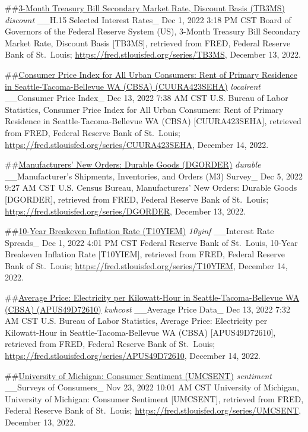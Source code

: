 \documentclass[
]{article}
\begin{document}
\#\#\href{https://fred.stlouisfed.org/series/TB3MS}{3-Month Treasury
Bill Secondary Market Rate, Discount Basis (TB3MS)} \emph{discount}
\_\_H.15 Selected Interest Rates\_ Dec 1, 2022 3:18 PM CST Board of
Governors of the Federal Reserve System (US), 3-Month Treasury Bill
Secondary Market Rate, Discount Basis {[}TB3MS{]}, retrieved from FRED,
Federal Reserve Bank of St.~Louis;
\url{https://fred.stlouisfed.org/series/TB3MS}, December 13, 2022.

\#\#\href{https://fred.stlouisfed.org/series/CUURA423SEHA}{Consumer
Price Index for All Urban Consumers: Rent of Primary Residence in
Seattle-Tacoma-Bellevue WA (CBSA) (CUURA423SEHA)} \emph{localrent}
\_\_Consumer Price Index\_ Dec 13, 2022 7:38 AM CST U.S. Bureau of Labor
Statistics, Consumer Price Index for All Urban Consumers: Rent of
Primary Residence in Seattle-Tacoma-Bellevue WA (CBSA)
{[}CUURA423SEHA{]}, retrieved from FRED, Federal Reserve Bank of
St.~Louis; \url{https://fred.stlouisfed.org/series/CUURA423SEHA},
December 14, 2022.

\#\#\href{https://fred.stlouisfed.org/series/DGORDER}{Manufacturers' New
Orders: Durable Goods (DGORDER)} \emph{durable} \_\_Manufacturer's
Shipments, Inventories, and Orders (M3) Survey\_ Dec 5, 2022 9:27 AM CST
U.S. Census Bureau, Manufacturers' New Orders: Durable Goods
{[}DGORDER{]}, retrieved from FRED, Federal Reserve Bank of St.~Louis;
\url{https://fred.stlouisfed.org/series/DGORDER}, December 13, 2022.

\#\#\href{https://fred.stlouisfed.org/series/T10YIEM}{10-Year Breakeven
Inflation Rate (T10YIEM)} \emph{10yinf} \_\_Interest Rate Spreads\_ Dec
1, 2022 4:01 PM CST Federal Reserve Bank of St.~Louis, 10-Year Breakeven
Inflation Rate {[}T10YIEM{]}, retrieved from FRED, Federal Reserve Bank
of St.~Louis; \url{https://fred.stlouisfed.org/series/T10YIEM}, December
14, 2022.

\#\#\href{https://fred.stlouisfed.org/series/APUS49D72610}{Average
Price: Electricity per Kilowatt-Hour in Seattle-Tacoma-Bellevue WA
(CBSA) (APUS49D72610)} \emph{kwhcost} \_\_Average Price Data\_ Dec 13,
2022 7:32 AM CST U.S. Bureau of Labor Statistics, Average Price:
Electricity per Kilowatt-Hour in Seattle-Tacoma-Bellevue WA (CBSA)
{[}APUS49D72610{]}, retrieved from FRED, Federal Reserve Bank of
St.~Louis; \url{https://fred.stlouisfed.org/series/APUS49D72610},
December 14, 2022.

\#\#\href{https://fred.stlouisfed.org/series/UMCSENT}{University of
Michigan: Consumer Sentiment (UMCSENT)} \emph{sentiment} \_\_Surveys of
Consumers\_ Nov 23, 2022 10:01 AM CST University of Michigan, University
of Michigan: Consumer Sentiment {[}UMCSENT{]}, retrieved from FRED,
Federal Reserve Bank of St.~Louis;
\url{https://fred.stlouisfed.org/series/UMCSENT}, December 13, 2022.
\end{document}
